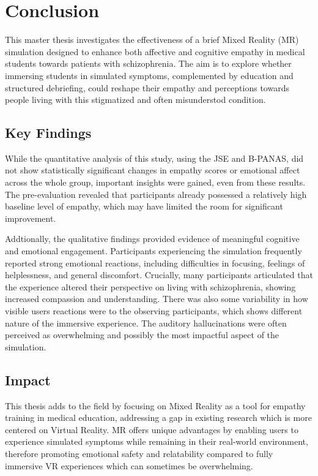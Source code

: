 \chapter{Conclusion}
\label{ch:conclusions}


This master thesis investigates the effectiveness of a brief Mixed Reality (MR) simulation designed to enhance both affective and cognitive empathy in medical students towards patients with schizophrenia. The aim is to explore whether immersing students in simulated symptoms, complemented by education and structured debriefing, could reshape their empathy and perceptions towards people living with this stigmatized and often misunderstod condition.

\section{Key Findings}
While the quantitative analysis of this study, using the JSE and B-PANAS, did not show statistically significant changes in empathy scores or emotional affect across the whole group, important insights were gained, even from these results. The pre-evaluation revealed that participants already possessed a relatively high baseline level of empathy, which may have limited the room for significant improvement.

\vspace{1em}

Addtionally, the qualitative findings provided evidence of meaningful cognitive and emotional engagement. Participants experiencing the simulation frequently reported strong emotional reactions, including difficulties in focusing, feelings of helplessness, and general discomfort. Crucially, many participants articulated that the experience altered their perspective on living with schizophrenia, showing increased compassion and understanding. There was also some variability in how visible users reactions were to the observing participants, which shows different nature of the immersive experience. The auditory hallucinations were often perceived as overwhelming and possibly the most impactful aspect of the simulation.


\section{Impact}
This thesis adds to the field by focusing on Mixed Reality as a tool for empathy training in medical education, addressing a gap in existing research which is more centered on Virtual Reality. MR offers unique advantages by enabling users to experience simulated symptoms while remaining in their real-world environment, therefore promoting emotional safety and relatability compared to fully immersive VR experiences which can sometimes be overwhelming.

